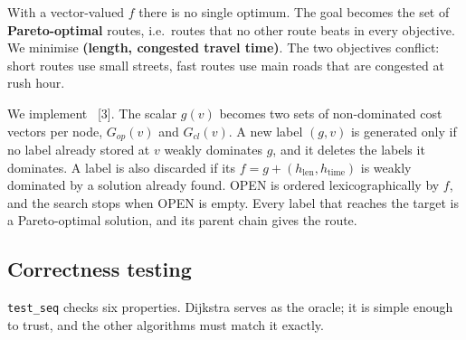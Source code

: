 With a vector-valued $f$ there is no single optimum. The goal becomes the set
of \textbf{Pareto-optimal} routes, i.e.\ routes that no other route beats in
every objective. We minimise \textbf{(length, congested travel time)}. The two
objectives conflict: short routes use small streets, fast routes use main roads
that are congested at rush hour.

We implement \NAMOA{}~[3]. The scalar $g(v)$ becomes two sets of
non-dominated cost vectors per node, $G_{op}(v)$ and $G_{cl}(v)$. A new label
$(g, v)$ is generated only if no label already stored at $v$ weakly dominates
$g$, and it deletes the labels it dominates. A label is also discarded if its
$f = g + (h_{\mathrm{len}}, h_{\mathrm{time}})$ is weakly dominated by a
solution already found. OPEN is ordered lexicographically by $f$, and the
search stops when OPEN is empty. Every label that reaches the target is a
Pareto-optimal solution, and its parent chain gives the route.

\subsection{Correctness testing}
\label{sec:seq-test}

\texttt{test\_seq} checks six properties. Dijkstra serves as the oracle; it is
simple enough to trust, and the other algorithms must match it exactly.

